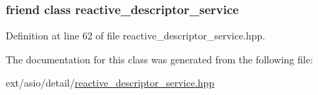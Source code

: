 \subsubsection[{reactive\+\_\+descriptor\+\_\+service}]{\setlength{\rightskip}{0pt plus 5cm}friend class {\bf reactive\+\_\+descriptor\+\_\+service}\hspace{0.3cm}{\ttfamily [friend]}}\label{classasio_1_1detail_1_1reactive__descriptor__service_1_1implementation__type_a9513c10d04bfd7295b1cdfec0f2213a6}


Definition at line 62 of file reactive\+\_\+descriptor\+\_\+service.\+hpp.



The documentation for this class was generated from the following file\+:\begin{DoxyCompactItemize}
\item 
ext/asio/detail/\hyperlink{reactive__descriptor__service_8hpp}{reactive\+\_\+descriptor\+\_\+service.\+hpp}\end{DoxyCompactItemize}
